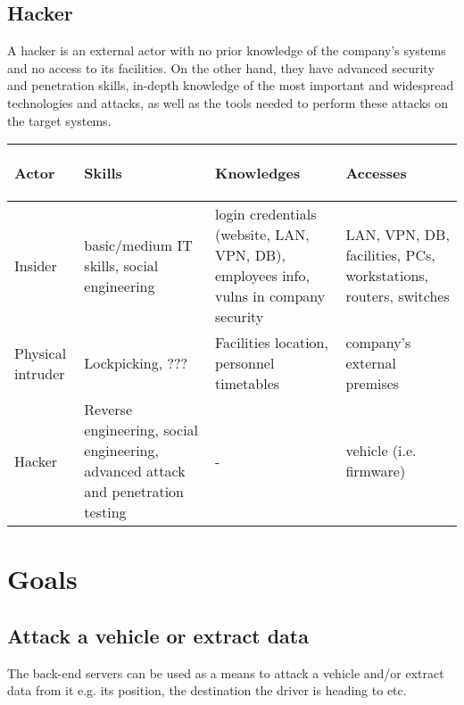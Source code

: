 \subsection*{Hacker}
A hacker is an external actor with no prior knowledge of the company's systems and no access to its facilities.
On the other hand, they have advanced security and penetration skills, in-depth knowledge of the most important and widespread technologies and attacks, as well as the tools needed to perform these attacks on the target systems.
\hfill
\hfill


\begin{center}
    \begin{tabular}{ | p{1.5 cm} | p{3.5cm} | p{3.5cm} | p{3.5cm} |}
    \hline
    \begin{center}
    	\textbf{Actor}
    \end{center} & 
    \begin{center}
    	\textbf{Skills}
  	\end{center} & 
    \begin{center}
    	\textbf{Knowledges}
   	\end{center} &
    \begin{center}
    	\textbf{Accesses} 
    \end{center} \\ \hline
    Insider & basic/medium IT skills, social engineering & login credentials (website, LAN, VPN, DB), employees info, vulns in company security & LAN, VPN, DB, facilities, PCs, workstations, routers, switches \\ \hline
    Physical intruder & Lockpicking, ??? & Facilities location, personnel timetables & company's external premises \\ \hline
    Hacker & Reverse engineering, social engineering, advanced attack and penetration testing & - & vehicle (i.e. firmware) \\
    \hline
    \end{tabular}
\end{center}


\section{Goals}

\subsection*{Attack a vehicle or extract data}
The back-end servers can be used as a means to attack a vehicle and/or extract data from it e.g. its position, the destination the driver is heading to etc.

